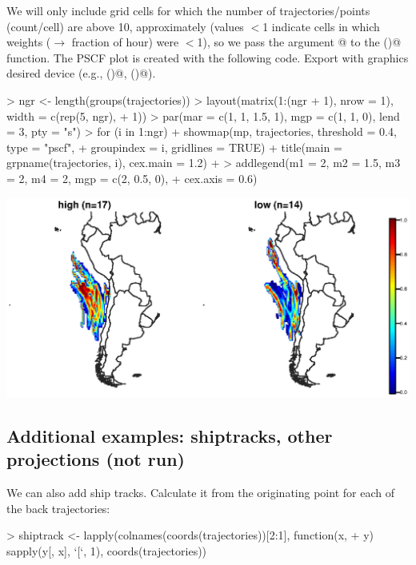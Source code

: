 \documentclass{article}
\renewenvironment{Schunk}{\vspace{\topsep}}{\vspace{\topsep}}
\begin{document}
We will only include grid cells for which the number of
trajectories/points (count/cell) are above 10, approximately (values
$<$1 indicate cells in which weights ($\to$ fraction of hour) were
$<$1), so we pass the argument @ to the
\verb@showmap()@ function. The PSCF plot is created with the following
code. Export with graphics desired device (e.g., \verb@pdf()@,
\verb@png()@).

\begin{Schunk}
\begin{Sinput}
> ngr <- length(groups(trajectories))
> layout(matrix(1:(ngr + 1), nrow = 1), width = c(rep(5, ngr), 
+     1))
> par(mar = c(1, 1, 1.5, 1), mgp = c(1, 1, 0), lend = 3, pty = "s")
> for (i in 1:ngr) {
+     showmap(mp, trajectories, threshold = 0.4, type = "pscf", 
+         groupindex = i, gridlines = TRUE)
+     title(main = grpname(trajectories, i), cex.main = 1.2)
+ }
> addlegend(m1 = 2, m2 = 1.5, m3 = 2, m4 = 2, mgp = c(2, 0.5, 0), 
+     cex.axis = 0.6)
\end{Sinput}
\end{Schunk}
\includegraphics{figures/fig-018}

\subsection{Additional examples: shiptracks, other projections (not run)}


We can also add ship tracks. Calculate it from the originating point
for each of the back trajectories:

\begin{Schunk}
\begin{Sinput}
> shiptrack <- lapply(colnames(coords(trajectories))[2:1], function(x, 
+     y) sapply(y[, x], `[`, 1), coords(trajectories))
\end{Sinput}
\end{Schunk}
\end{document}
